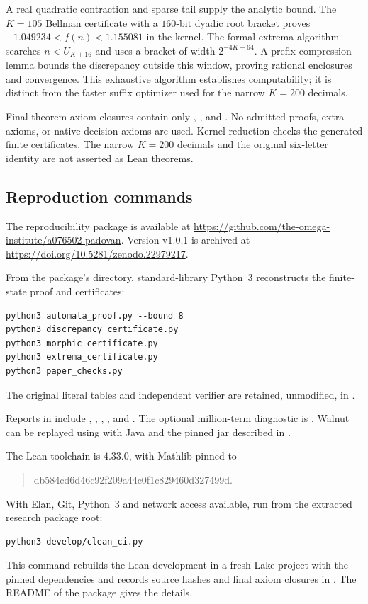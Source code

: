 A real quadratic contraction and sparse tail supply the analytic bound.
The $K=105$ Bellman certificate with a $160$-bit dyadic root bracket
proves $-1.049234<f(n)<1.155081$ in the kernel.
The formal extrema algorithm searches $n<U_{K+16}$ and uses a bracket of
width $2^{-4K-64}$. A prefix-compression lemma bounds the discrepancy
outside this window, proving rational enclosures and convergence.
This exhaustive algorithm establishes computability; it is distinct from
the faster suffix optimizer used for the narrow $K=200$ decimals.

Final theorem axiom closures contain only ,
, and . No admitted proofs,
extra axioms, or native decision axioms are used. Kernel reduction checks
the generated finite certificates. The narrow $K=200$ decimals and
the original six-letter identity are not asserted as Lean theorems.

\newpage
\subsection{Reproduction commands}
The reproducibility package is available at
\url{https://github.com/the-omega-institute/a076502-padovan}.
Version v1.0.1 is archived at
\url{https://doi.org/10.5281/zenodo.22979217}.

From the package's  directory, standard-library Python~3
reconstructs the finite-state proof and certificates:
\begin{verbatim}
python3 automata_proof.py --bound 8
python3 discrepancy_certificate.py
python3 morphic_certificate.py
python3 extrema_certificate.py
python3 paper_checks.py
\end{verbatim}
The original literal tables and independent verifier are retained,
unmodified, in .

Reports in  include
, , ,
, and .
The optional million-term diagnostic is .
Walnut can be replayed using  with Java and the
pinned jar described in .

The Lean toolchain is $4.33.0$, with Mathlib pinned to
\begin{quote}\small\ttfamily
db584cd6d46c92f209a44c0f1c829460d327499d.
\end{quote}
With Elan, Git, Python~3 and network access available, run from the
extracted research package root:
\begin{verbatim}
python3 develop/clean_ci.py
\end{verbatim}
This command rebuilds the Lean development in a fresh Lake project
with the pinned dependencies and records source hashes and final axiom
closures in . The README of the package gives
the details.

